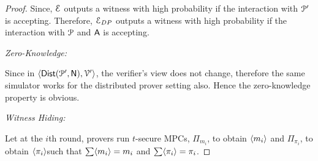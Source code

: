 \begin{proof}
	Since, $\mathcal{E}$ outputs a witness with high probability if the interaction with $\mathcal{P}'$ is accepting. Therefore, $\mathcal{E}_{DP}$ outputs a witness with high probability if the interaction with $\mathcal{P}$ and $\mathsf{A}$ is accepting. 
	
	
	
	
	
	
	\textit{Zero-Knowledge:}
	
	Since in $\langle \mathsf{Dist}(\mathcal{P}', \mathsf{N}), \mathcal{V}' \rangle$, the verifier's view does not change, therefore the same simulator works for the distributed prover setting also. Hence the zero-knowledge property is obvious.
	
	\textit{Witness Hiding:} 
	
	Let at the $i$th round, provers run $t$-secure MPCs, $\Pi_{m_i}$, to obtain $\langle m_i \rangle$ and $\Pi_{\pi_i}$, to obtain $\langle \pi_i \rangle$such that $\sum \langle m_i \rangle = m_i$ and $\sum \langle \pi_i \rangle = \pi_i$.
	

\end{proof}
